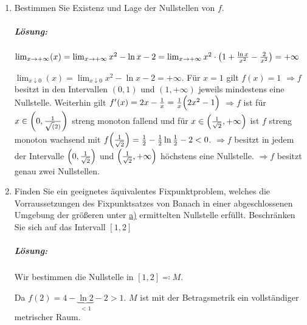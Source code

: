 \documentclass{scrreprt}
\begin{document}
\begin{enumerate}
\item Bestimmen Sie Existenz und Lage der Nullstellen von $f$.
  \label{sec:3_a}
  \subparagraph{Lösung:} $\lim_{x \to +\infty} (x) =
  \lim_{x \to +\infty} x^2 - \ln x  - 2
  = \lim_{x \to +\infty} x^2 \cdot \qty(1 + \frac{\ln x}{x ^ 2} - \frac{2}{x^2}) = +\infty$

  $\lim_{x \downarrow 0} (x) =
  \lim_{x \downarrow 0} x^2 - \ln x  - 2 = +\infty$.
  Für $x = 1$ gilt $f(x) = 1$
  $\Rightarrow f$ besitzt in den Intervallen $(0, 1)$ und $(1, +\infty)$
  jeweils mindestens eine Nullstelle.
  Weiterhin gilt $f'(x) = 2x - \frac{1}{x} = \frac{1}{x} \qty\Big(2 x^2  - 1)$
  $\Rightarrow f$ ist für $x \in \qty(0, \frac{1}{\sqrt(2)})$ streng monoton
  fallend und für $x \in \qty(\frac{1}{\sqrt{2}}, +\infty)$ ist $f$ streng
  monoton wachsend mit
  $f\qty(\frac{1}{\sqrt{2}}) = \frac{1}{2} - \frac{1}{2} \ln \frac{1}{2} - 2 < 0$.
  $\Rightarrow f$ besitzt in jedem der Intervalle
  $\qty(0, \frac{1}{\sqrt{2}})$ und $\qty(\frac{1}{\sqrt{2}}, +\infty)$
  höchstens eine Nullstelle.
  $\Rightarrow f$ besitzt genau zwei Nullstellen.

\item Finden Sie ein geeignetes äquivalentes Fixpunktproblem, welches
  die Vorraussetzungen des Fixpunktsatzes von Banach in einer abgeschlossenen
  Umgebung der größeren unter \hyperref[sec:3_a]{a)} ermittelten Nullstelle
  erfüllt.
  Beschränken Sie sich auf das Intervall $[1, 2]$

  \subparagraph{Lösung:} Wir bestimmen die Nullstelle in $[1, 2] \eqqcolon M$.

  Da $f(2) = 4 - \underset{< 1}{\underbrace{\ln 2}} - 2 > 1$.
  $M$ ist mit der Betragsmetrik ein vollständiger metrischer Raum.


\end{enumerate}
\end{document}
